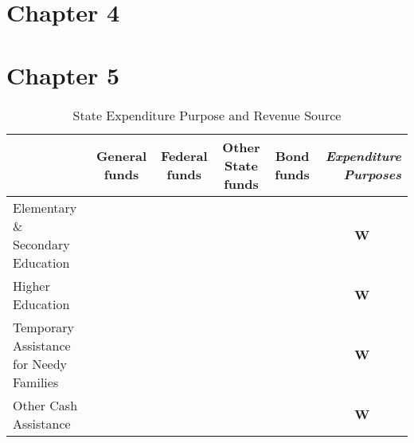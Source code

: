 \section{Chapter 4}

\clearpage
\section{Chapter 5}

\begin{table}[htbp]
    \centering
    \caption{State Expenditure Purpose and Revenue Source}
    \begin{tabular}{|l|c|c|c|c|r|}
        \hline
                                                                                             & \multicolumn{1}{p{4.355em}|}{General funds} & \multicolumn{1}{p{4.07em}|}{Federal funds} & \multicolumn{1}{p{5em}|}{Other State funds} & \multicolumn{1}{p{4.145em}|}{Bond funds} & \multicolumn{1}{p{6.785em}|}{\textit{\textbf{Expenditure Purposes}}} \\
        \hline
        \multicolumn{1}{|p{9.93em}|}{Elementary \& Secondary Education }                     &                                             &                                            &                                             &                                          & \multicolumn{1}{c|}{\textbf{W}}                                      \\
        \cline{2-6}    \multicolumn{1}{|p{9.93em}|}{Higher Education }                       &                                             &                                            &                                             &                                          & \multicolumn{1}{c|}{\textbf{W}}                                      \\
        \cline{2-6}    \multicolumn{1}{|p{9.93em}|}{Temporary Assistance for Needy Families} &                                             &                                            &                                             &                                          & \multicolumn{1}{c|}{\textbf{W}}                                      \\
        \cline{2-6}    \multicolumn{1}{|p{9.93em}|}{Other Cash Assistance}                   &                                             &                                            &                                             &                                          & \multicolumn{1}{c|}{\textbf{W}}                                      \\

\end{tabular}
\end{table}
